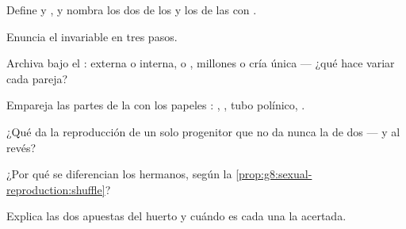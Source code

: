 \begin{exercise}[$\star$]\label{exo:g8:sexual-reproduction:1}
Define  y , y nombra los dos  de los  y los
de las  con .
\end{exercise}

\begin{exercise}[$\star$]\label{exo:g8:sexual-reproduction:2}
Enuncia el  invariable en tres pasos.
\end{exercise}

\begin{exercise}[$\star$]\label{exo:g8:sexual-reproduction:3}
Archiva bajo el :  externa o interna,  o
, millones o cría única --- ¿qué hace variar cada pareja?
\end{exercise}

\begin{exercise}[$\star$]\label{exo:g8:sexual-reproduction:4}
Empareja las partes de la  con los papeles : ,
, tubo polínico, .
\end{exercise}

\begin{exercise}[$\star$]\label{exo:g8:sexual-reproduction:5}
¿Qué da la reproducción de un solo progenitor que no da nunca la de
dos --- y al revés?
\end{exercise}

\begin{exercise}[$\star$]\label{exo:g8:sexual-reproduction:6}
¿Por qué se diferencian los hermanos, según la
\cref{prop:g8:sexual-reproduction:shuffle}?
\end{exercise}

\begin{exercise}[$\star\star$]\label{exo:g8:sexual-reproduction:7}
Explica las dos apuestas del huerto y cuándo es cada una la acertada.
\end{exercise}

